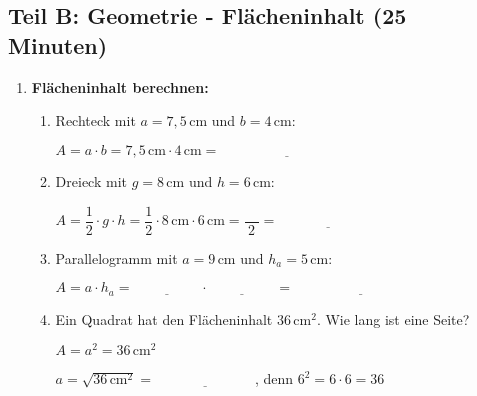 \subsection*{Teil B: Geometrie - Flächeninhalt (25 Minuten)}

\begin{enumerate}[label=\arabic*.]
    \item \textbf{Flächeninhalt berechnen:}
    \vspace{0.5cm}

    \begin{enumerate}[label=\alph*)]
        \item Rechteck mit $a = 7{,}5\,\text{cm}$ und $b = 4\,\text{cm}$:

        $A = a \cdot b = 7{,}5\,\text{cm} \cdot 4\,\text{cm} = \underline{\hspace{4cm}}$

        \vspace{0.5cm}

        \item Dreieck mit $g = 8\,\text{cm}$ und $h = 6\,\text{cm}$:

        $A = \dfrac{1}{2} \cdot g \cdot h = \dfrac{1}{2} \cdot 8\,\text{cm} \cdot 6\,\text{cm} = \dfrac{\phantom{00}}{2} = \underline{\hspace{3cm}}$

        \vspace{0.5cm}

        \item Parallelogramm mit $a = 9\,\text{cm}$ und $h_a = 5\,\text{cm}$:

        $A = a \cdot h_a = \underline{\hspace{2cm}} \cdot \underline{\hspace{2cm}} = \underline{\hspace{4cm}}$

        \vspace{0.5cm}

        \item Ein Quadrat hat den Flächeninhalt $36\,\text{cm}^2$. Wie lang ist eine Seite?

        $A = a^2 = 36\,\text{cm}^2$

        $a = \sqrt{36\,\text{cm}^2} = \underline{\hspace{3cm}}$, denn $6^2 = 6 \cdot 6 = 36$
    \end{enumerate}

    \vspace{1cm}


\end{enumerate}
